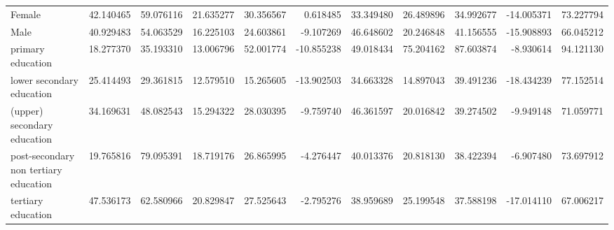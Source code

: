\documentclass{article}
\begin{document}
\begin{table}[!htbp]
{\begin{tabular}{lrrrrrrrrrr}
Female                                &  42.140465 &  59.076116 &  21.635277 &  30.356567 &   0.618485 &  33.349480 &  26.489896 &  34.992677 &  -14.005371 &   73.227794 \\
Male                                  &  40.929483 &  54.063529 &  16.225103 &  24.603861 &  -9.107269 &  46.648602 &  20.246848 &  41.156555 &  -15.908893 &   66.045212 \\
primary education                     &  18.277370 &  35.193310 &  13.006796 &  52.001774 & -10.855238 &  49.018434 &  75.204162 &  87.603874 &   -8.930614 &   94.121130 \\
lower secondary education             &  25.414493 &  29.361815 &  12.579510 &  15.265605 & -13.902503 &  34.663328 &  14.897043 &  39.491236 &  -18.434239 &   77.152514 \\
(upper) secondary education           &  34.169631 &  48.082543 &  15.294322 &  28.030395 &  -9.759740 &  46.361597 &  20.016842 &  39.274502 &   -9.949148 &   71.059771 \\
post-secondary non tertiary education &  19.765816 &  79.095391 &  18.719176 &  26.865995 &  -4.276447 &  40.013376 &  20.818130 &  38.422394 &   -6.907480 &   73.697912 \\
tertiary education                    &  47.536173 &  62.580966 &  20.829847 &  27.525643 &  -2.795276 &  38.959689 &  25.199548 &  37.588198 &  -17.014110 &   67.006217 \\
\bottomrule
\end{tabular}
}
\end{table}
\end{document}
